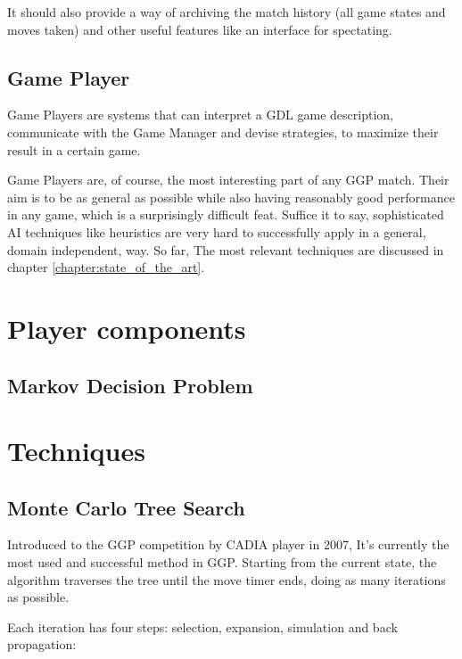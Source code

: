 It should also provide a way of archiving the match history (all game states and moves taken) and other useful features like an interface for spectating.

\subsection{Game Player}
Game Players are systems that can interpret a \gls{GDL} game description, communicate with the Game Manager and devise strategies, to maximize their result in a certain game.

Game Players are, of course, the most interesting part of any \gls{GGP} match. Their aim is to be as general as possible while also having reasonably good performance in any game, which is a surprisingly difficult feat. Suffice it to say, sophisticated AI techniques like heuristics are very hard to successfully apply in a general, domain independent, way. So far, 
The most relevant techniques are discussed in chapter \ref{chapter:state_of_the_art}.

\section{Player components}

\subsection{Markov Decision Problem}

\section{Techniques}
\subsection{Monte Carlo Tree Search}
Introduced to the GGP competition by CADIA player in 2007, It’s currently the most used and successful method in GGP. Starting from the current state, the algorithm traverses the tree until the move timer ends, doing as many iterations as possible.

Each iteration has four steps: selection, expansion, simulation and back propagation:

